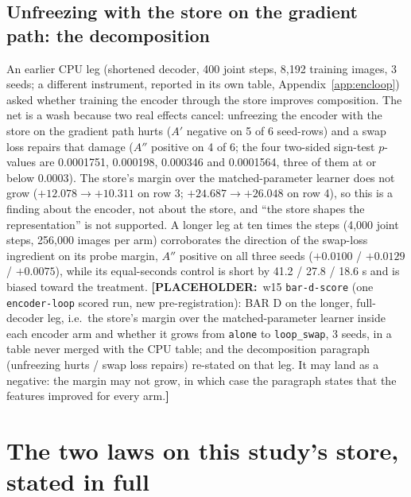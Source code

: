 \documentclass{article}
\newcommand{\PLACEHOLDER}[1]{{\color{red}\textbf{[PLACEHOLDER:}~#1\textbf{]}}}
\begin{document}
\subsection*{Unfreezing with the store on the gradient path: the decomposition}

An earlier CPU leg (shortened decoder, 400 joint steps, 8,192 training images, 3 seeds; a
different instrument, reported in its own table, Appendix~\ref{app:encloop}) asked whether
training the encoder through the store improves composition. The net is a wash because two
real effects cancel: unfreezing the encoder with the store on the gradient path hurts ($A'$
negative on 5 of 6 seed-rows) and a swap loss repairs that damage ($A''$ positive on 4 of 6;
the four two-sided sign-test $p$-values are 0.0001751, 0.000198, 0.000346 and 0.0001564, three
of them at or below 0.0003). The store's margin over
the matched-parameter learner does not grow ($+12.078\to+10.311$ on row 3; $+24.687\to+26.048$
on row 4), so this is a finding about the encoder, not about the store, and ``the store shapes
the representation'' is not supported.
A longer leg at ten times the steps (4,000 joint steps, 256,000 images per arm) corroborates
the direction of the swap-loss ingredient on its probe margin, $A''$ positive on all three
seeds ($+0.0100$ / $+0.0129$ / $+0.0075$), while its equal-seconds control is short by 41.2 /
27.8 / 18.6 s and is biased toward the treatment.
\PLACEHOLDER{w15 \texttt{bar-d-score} (one \texttt{encoder-loop} scored run, new
pre-registration): BAR D on the longer, full-decoder leg, i.e.\ the store's margin over the
matched-parameter learner inside each encoder arm and whether it grows from \texttt{alone} to
\texttt{loop\_swap}, 3 seeds, in a table never merged with the CPU table; and the decomposition
paragraph (unfreezing hurts / swap loss repairs) re-stated on that leg. It may land as a
negative: the margin may not grow, in which case the paragraph states that the features
improved for every arm.}

\section{The two laws on this study's store, stated in full}
\label{app:laws}
\end{document}
